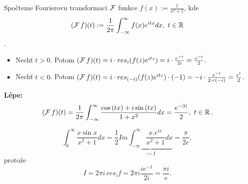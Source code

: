\begin{example}
Spočteme Fourierovu transformaci $\operatorname{\mathcal{F}} $ funkce $f(x):=\frac{1}{x^2+1}$, kde
$$(\F f)(t):=\frac{1}{2\pi}\int_{-\infty}^\infty{f(x)e^{itx}}dx, \ t\in\Real $$.
\begin{itemize}
    \item Nechť $t>0$. Potom $(\operatorname{\mathcal{F}} f)(t)=i\cdot{res}_i{(f(z)e^{itz})}=i\cdot\frac{e^{-t}}{2i}=\frac{e^{-t}}{2}$.
    \item Nechť $t<0$. Potom $(\operatorname{\mathcal{F}} f)(t)=i\cdot{res}_{(-i)}{(f(z)e^{itz})}\cdot(-1)=-i\cdot\frac{e^{-t}}{2\cdot  r(-i)}=\frac{e^{t}}{2}$.
\end{itemize}
\textbf{Lépe:}
$$(\operatorname{\mathcal{F}} f)(t)=\frac{1}{2\pi}\int_{-\infty}^\infty\frac{\cos{(tx)}+i\sin{(tx)}}{1+x^2}dx=\frac{e^{-|t|}}{2}, \ t\in\operatorname{\mathbb{R}} .$$
\end{example}

\begin{example}
$$\int_0^\infty\frac{x\sin{x}}{x^2+1}dx=\frac{1}{2}{Im}\underset{:=I}{\underbrace{\int_{-\infty}^\infty\frac{x.e^{ix}}{x^2+1}dx}}=\frac{\pi}{2e},$$
protože
$$I=2\pi i\,{res}_{i}{f}=2\pi i \frac{ie^{-1}}{2i}=\frac{\pi i}{e}.$$
\end{example}